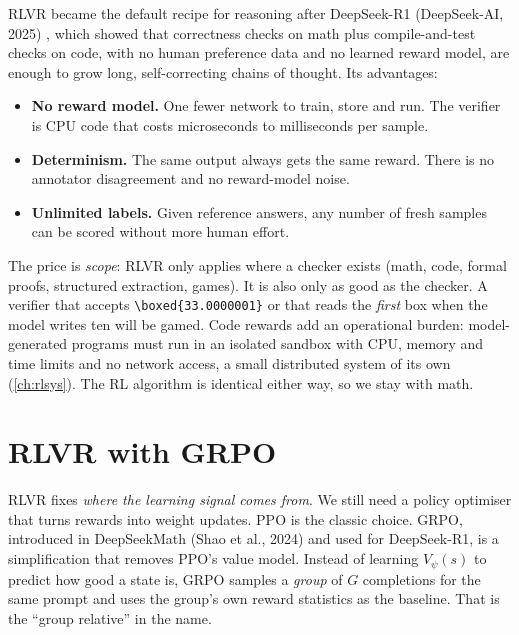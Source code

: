 RLVR became the default recipe for reasoning after DeepSeek-R1 (DeepSeek-AI, 2025)
, which showed that correctness checks on math plus compile-and-test checks on code,
with no human preference data and no learned reward model, are enough to grow long,
self-correcting chains of thought. Its advantages:
\begin{itemize}
\item \textbf{No reward model.} One fewer network to train, store and run. The verifier
is CPU code that costs microseconds to milliseconds per sample.
\item \textbf{Determinism.} The same output always gets the same reward. There is no
annotator disagreement and no reward-model noise.
\item \textbf{Unlimited labels.} Given reference answers, any number of fresh samples can
be scored without more human effort.
\end{itemize}
The price is \emph{scope}: RLVR only applies where a checker exists (math, code, formal
proofs, structured extraction, games). It is also only as good as the checker. A verifier
that accepts \verb|\boxed{33.0000001}| or that reads the \emph{first} box when the model
writes ten will be gamed. Code rewards add an operational burden: model-generated programs
must run in an isolated sandbox with CPU, memory and time limits and no network access, a
small distributed system of its own (\cref{ch:rlsys}). The RL algorithm is identical either
way, so we stay with math.

\section{RLVR with GRPO}\label{sec:grpo:grpo}

RLVR fixes \emph{where the learning signal comes from}. We still need a policy optimiser
that turns rewards into weight updates. PPO is the classic choice. GRPO, introduced in
DeepSeekMath (Shao et al., 2024) and used for DeepSeek-R1, is a simplification
that removes PPO's value model. Instead of learning $V_\psi(s)$ to predict how good a state
is, GRPO samples a \emph{group} of $G$ completions for the same prompt and uses the group's
own reward statistics as the baseline. That is the ``group relative'' in the name.

